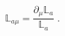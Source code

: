 \begin{equation}
\label{e4:41}
{\mathbb{L}}_{a \mu}=\frac{\partial_{\mu}{\mathbb{L}}_{a}}{{\mathbb{L}}_{a}} \; .
\end{equation}

